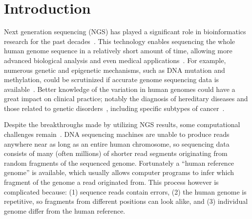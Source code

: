 \documentclass{PHlab-thesis}
\begin{document}

\printnomenclature[5cm]

\newpage
\setcounter{page}{1}


\chapter{Introduction}
Next generation sequencing (NGS) has played a significant role in bioinformatics research for the past decades~\cite{behjati2013next,schuster2008next}. This technology enables sequencing the whole human genome sequence in a relatively short amount of time, allowing more advanced biological analysis and even medical applications~\cite{roukos2010next}. For example, numerous genetic and epigenetic mechanisms, such as DNA mutation and methylation, could be scrutinized if accurate genome sequencing data is available~\cite{moore2013dna}. Better knowledge of the variation in human genomes could have a great impact on clinical practice; notably the diagnosis of hereditary diseases and those related to genetic disorders~\cite{shashi2014utility,stenson2017human}, including specific subtypes of cancer~\cite{serrati2016next}.

Despite the breakthroughs made by utilizing NGS results, some computational challenges remain~\cite{muzzey2015understanding}.  DNA sequencing machines are unable to produce reads anywhere near as long as an entire human chromosome, so sequencing data consists of many (often millions) of shorter read segments originating from random fragments of the sequenced genome.  Fortunately a ``human reference genome'' is available, which usually allows computer programs to infer which fragment of the genome a read originated from.  This process however is complicated because: (1) sequence reads contain errors, (2) the human genome is repetitive, so fragments from different positions can look alike, and (3) individual genome differ from the human reference.
\end{document}
